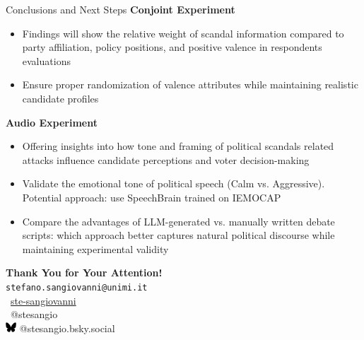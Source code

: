 \documentclass[10pt, aspectratio=169]{beamer}
\newcommand{\customcite}[1]{\textcolor{blue}{\parencite{#1}}}
\begin{document}
\begin{frame}{Conclusions and Next Steps}
\textbf{Conjoint Experiment}
\begin{itemize}
    \item Findings will show the relative weight of scandal information compared to party affiliation, policy positions, and positive valence in respondents evaluations \vspace{0.2cm}
    \item Ensure proper randomization of valence attributes while maintaining realistic candidate profiles 

\end{itemize}
\vspace{0.2cm}
\textbf{Audio Experiment}
\begin{itemize}
    \item Offering insights into how tone and framing of political scandals related attacks influence candidate perceptions and voter decision-making
    \vspace{0.2cm}
    \item Validate the emotional tone of political speech (Calm vs. Aggressive). Potential approach: use SpeechBrain \customcite{speechbrain} trained on IEMOCAP
    \vspace{0.2cm}
    \item Compare the advantages of LLM-generated vs. manually written debate scripts: which approach better captures natural political discourse while maintaining experimental validity
\end{itemize}
\end{frame}

\begin{frame}[plain]
\centering
\vspace{2cm}
\textbf{\large Thank You for Your Attention!} \\ [0.2cm] 
\texttt{stefano.sangiovanni@unimi.it} \\[3cm]

\faGithub\ \href{https://github.com/ste-sangiovanni}{ste-sangiovanni} \\[0.1cm]
\faTwitter\ @stesangio \\ 
\includegraphics[width=0.03\textwidth]{images/Bluesky_logo_(black).svg.png} @stesangio.bsky.social
\vspace{0.2cm}
\end{frame}
\end{document}
